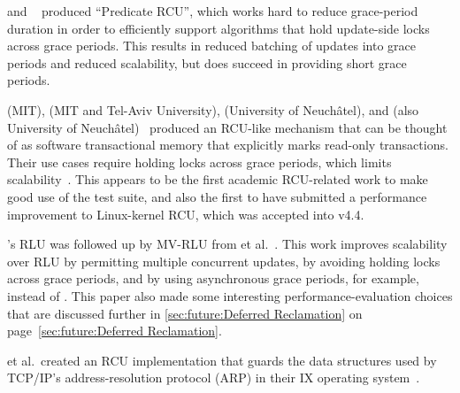  and ~\cite{Arbel:2015:PRR:2858788.2688518}
produced ``Predicate RCU'', which works hard to reduce grace-period
duration in order to efficiently support algorithms that hold
update-side locks across grace periods.
This results in reduced batching of updates into grace periods
and reduced scalability, but does succeed in providing short
grace periods.

\QuickQuizEnd

 (MIT),  (MIT and Tel-Aviv University),
 (University of Neuch\^{a}tel), and  (also
University of Neuch\^{a}tel)~\cite{Matveev:2015:RLS:2815400.2815406}
produced an RCU-like mechanism that can be thought of as
software transactional memory that explicitly marks
read-only transactions.
Their use cases require holding locks across grace periods, which limits
scalability~\cite{PaulEMcKenney2015ReadMostly,PaulEMcKenney2015ReadMostlySidebar}.
This appears to be the first academic RCU-related work to
make good use of the  test suite, and also the
first to have submitted a performance improvement to Linux-kernel
RCU, which was accepted into v4.4.

's RLU was followed up by MV-RLU from
 et al.~\cite{Kim:2019:MSR:3297858.3304040}.
This work improves scalability over RLU by permitting multiple concurrent
updates, by avoiding holding locks across grace periods, and by using
asynchronous grace periods, for example,  instead of
.
This paper also made some interesting performance-evaluation choices that
are discussed further in
\cref{sec:future:Deferred Reclamation}
on
page~\ref{sec:future:Deferred Reclamation}.

 et al.~created an RCU implementation that guards the
data structures used by TCP/IP's address-resolution protocol (ARP)
in their IX operating system~\cite{Belay:2016:IOS:3014162.2997641}.

